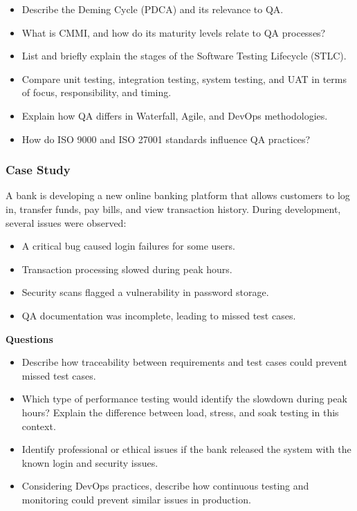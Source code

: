 \begin{itemize}
    \item Describe the Deming Cycle (PDCA) and its relevance to QA.
    \item What is CMMI, and how do its maturity levels relate to QA processes?
    \item List and briefly explain the stages of the Software Testing Lifecycle (STLC).
    \item Compare unit testing, integration testing, system testing, and UAT in terms of focus, responsibility, and timing.
    \item Explain how QA differs in Waterfall, Agile, and DevOps methodologies.
    \item How do ISO 9000 and ISO 27001 standards influence QA practices?
\end{itemize}

\subsubsection{Case Study}

\indent 

A bank is developing a new online banking platform that allows customers to log in, transfer funds, pay bills, and view transaction history. During development, several issues were observed:

\begin{itemize}
    \item A critical bug caused login failures for some users.
    \item Transaction processing slowed during peak hours.
    \item Security scans flagged a vulnerability in password storage.
    \item QA documentation was incomplete, leading to missed test cases.
\end{itemize}

\bigskip

\noindent\textbf{Questions}

\begin{itemize}
    \item Describe how traceability between requirements and test cases could prevent missed test cases.
    \item Which type of performance testing would identify the slowdown during peak hours? Explain the difference between load, stress, and soak testing in this context.
    \item Identify professional or ethical issues if the bank released the system with the known login and security issues.
    \item Considering DevOps practices, describe how continuous testing and monitoring could prevent similar issues in production.
\end{itemize}